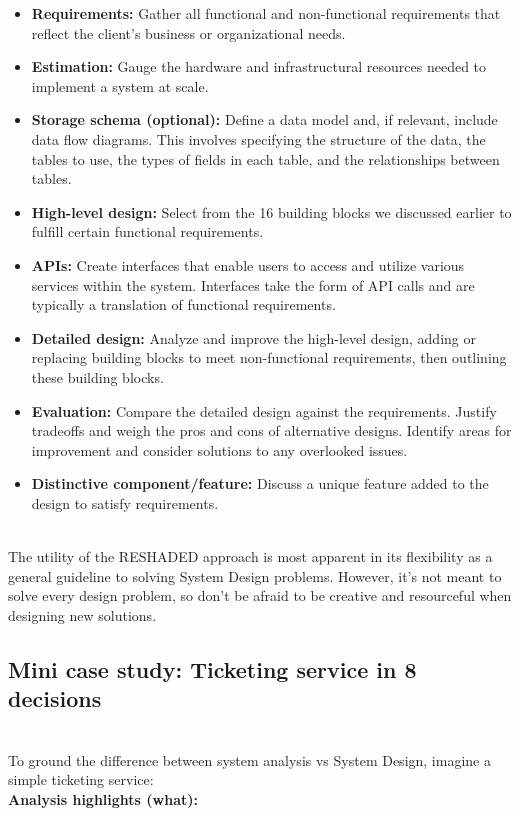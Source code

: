 \begin{itemize}
\item
\protect{}\label{OGkDgHSo9bqF3NRD3M4Ya}
\textbf{Requirements:} Gather all functional and non-functional requirements that reflect the client's business or organizational needs.
\item
\protect{}\label{03s6EWhqCoM5dXHOrIYty}
\textbf{Estimation:} Gauge the hardware and infrastructural resources needed to implement a system at scale.
\item
\protect{}\label{wsaaGdv2GVkY3LBxhPbXz}
\textbf{Storage schema (optional):} Define a data model and, if relevant, include data flow diagrams. This involves specifying the structure of the data, the tables to use, the types of fields in each table, and the relationships between tables.
\item
\protect{}\label{zC7DZ0VCHFESOqfHRYZn-}
\textbf{High-level design:} Select from the 16 building blocks we discussed earlier to fulfill certain functional requirements.
\item
\protect{}\label{npJukv-P7tpxD68yd2EHY}
\textbf{APIs:} Create interfaces that enable users to access and utilize various services within the system. Interfaces take the form of API calls and are typically a translation of functional requirements.
\item
\protect{}\label{kJvQlon7VPaTJ3JCkB-yj}
\textbf{Detailed design:} Analyze and improve the high-level design, adding or replacing building blocks to meet non-functional requirements, then outlining these building blocks.
\item
\protect{}\label{EE8JCwWrh_S1o1Epz7BVn}
\textbf{Evaluation:} Compare the detailed design against the requirements. Justify tradeoffs and weigh the pros and cons of alternative designs. Identify areas for improvement and consider solutions to any overlooked issues.
\item
\protect{}\label{rn4OVz2vEX_7rVNcSNkTZ}
\textbf{Distinctive component/feature:} Discuss a unique feature added to the design to satisfy requirements.
\end{itemize}
\\
The utility of the RESHADED approach is most apparent in its flexibility as a general guideline to solving System Design problems. However, it's not meant to solve every design problem, so don't be afraid to be creative and resourceful when designing new solutions.

\subsection{Mini case study: Ticketing service in 8 decisions}\label{5AwqYpsCEbgc_lorPMRqD}
\\
To ground the difference between system analysis vs System Design, imagine a simple ticketing service:
\\
\textbf{Analysis highlights (what):}

